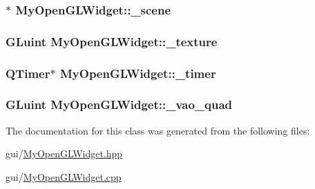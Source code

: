 \hypertarget{class_my_open_g_l_widget_a26a1f259357dd7c8822d715d81591395}{
\subsubsection[{\+\_\+scene}]{$\ast$ My\+Open\+G\+L\+Widget\+::\+\_\+scene\hspace{0.3cm}{\ttfamily [private]}}}\label{class_my_open_g_l_widget_a26a1f259357dd7c8822d715d81591395}
\hypertarget{class_my_open_g_l_widget_a18d7f106f5e12568f5db59d8c4a71706}{
\subsubsection[{\+\_\+texture}]{\setlength{\rightskip}{0pt plus 5cm}G\+Luint My\+Open\+G\+L\+Widget\+::\+\_\+texture\hspace{0.3cm}{\ttfamily [private]}}}\label{class_my_open_g_l_widget_a18d7f106f5e12568f5db59d8c4a71706}
\hypertarget{class_my_open_g_l_widget_aa6ba509f0ef6e8c2d266b83e1d380eb8}{
\subsubsection[{\+\_\+timer}]{\setlength{\rightskip}{0pt plus 5cm}Q\+Timer$\ast$ My\+Open\+G\+L\+Widget\+::\+\_\+timer\hspace{0.3cm}{\ttfamily [private]}}}\label{class_my_open_g_l_widget_aa6ba509f0ef6e8c2d266b83e1d380eb8}
\hypertarget{class_my_open_g_l_widget_a63a814817d1af6ea49036edac108183b}{
\subsubsection[{\+\_\+vao\+\_\+quad}]{\setlength{\rightskip}{0pt plus 5cm}G\+Luint My\+Open\+G\+L\+Widget\+::\+\_\+vao\+\_\+quad\hspace{0.3cm}{\ttfamily [private]}}}\label{class_my_open_g_l_widget_a63a814817d1af6ea49036edac108183b}


The documentation for this class was generated from the following files\+:\begin{DoxyCompactItemize}
\item 
gui/\hyperlink{_my_open_g_l_widget_8hpp}{My\+Open\+G\+L\+Widget.\+hpp}\item 
gui/\hyperlink{_my_open_g_l_widget_8cpp}{My\+Open\+G\+L\+Widget.\+cpp}\end{DoxyCompactItemize}
